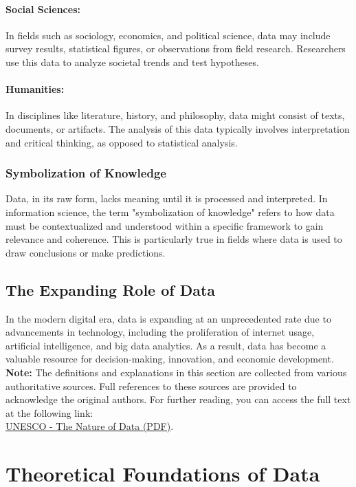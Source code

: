 \documentclass[12pt, oneside]{book}
\begin{document}
\paragraph{Social Sciences:} In fields such as sociology, economics, and political science, data may include survey results, statistical figures, or observations from field research. Researchers use this data to analyze societal trends and test hypotheses.\\
\paragraph{Humanities:} In disciplines like literature, history, and philosophy, data might consist of texts, documents, or artifacts. The analysis of this data typically involves interpretation and critical thinking, as opposed to statistical analysis.\\
\subsubsection{Symbolization of Knowledge}
Data, in its raw form, lacks meaning until it is processed and interpreted. In information science, the term "symbolization of knowledge" refers to how data must be contextualized and understood within a specific framework to gain relevance and coherence. This is particularly true in fields where data is used to draw conclusions or make predictions.\\
\subsection{The Expanding Role of Data}
In the modern digital era, data is expanding at an unprecedented rate due to advancements in technology, including the proliferation of internet usage, artificial intelligence, and big data analytics. As a result, data has become a valuable resource for decision-making, innovation, and economic development.
\vspace{0.5cm}\\
\textbf{Note:} The definitions and explanations in this section are collected from various authoritative sources. Full references to these sources are provided to acknowledge the original authors. For further reading, you can access the full text at the following link: \\
 \href{https://egyankosh.ac.in/bitstream/123456789/10935/3/Unit-2.pdf}{UNESCO - The Nature of Data (PDF)}.

\section{Theoretical Foundations of Data}
\end{document}
